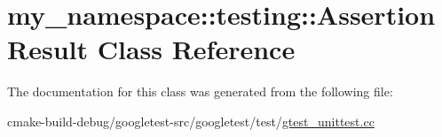 \hypertarget{classmy__namespace_1_1testing_1_1AssertionResult}{}\section{my\+\_\+namespace\+::testing\+::Assertion\+Result Class Reference}
\label{classmy__namespace_1_1testing_1_1AssertionResult}


The documentation for this class was generated from the following file\+:\begin{DoxyCompactItemize}
\item 
cmake-\/build-\/debug/googletest-\/src/googletest/test/\mbox{\hyperlink{gtest__unittest_8cc}{gtest\+\_\+unittest.\+cc}}\end{DoxyCompactItemize}
